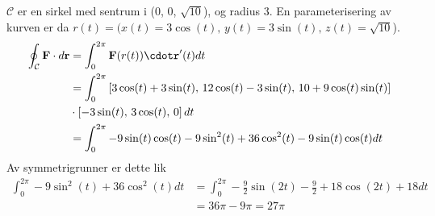 \documentclass[11pt, a4paper, norsk]{NTNUoving}
\begin{document}
\begin{oppgave}
    $\mathcal{C}$ er en sirkel med sentrum i (0, 0, $\sqrt{10}$), og radius 3. En parameterisering av kurven er da $r(t)=(x(t)=3\cos(t),\, y(t)=3\sin(t),\,z(t)=\sqrt{10}$).
    \begin{align*}
        \oint_\mathcal{C}\textbf{F}\cdot d\textbf{r} &= \int_0^{2\pi}\textbf{F}(r(t))\cdotr'(t)dt
        \\&=\int_0^{2\pi}\left[3\cos(t)+3\sin(t),\, 12\cos(t)-3\sin(t),\, 10+9\cos(t)\sin(t)\right]
        \\&\cdot \left[-3\sin(t),\, 3\cos(t),\,0\right] dt
        \\&=\int_0^{2\pi} -9\sin(t)\cos(t)-9\sin^2(t)+36\cos^2(t)-9\sin(t)\cos(t)dt
    \end{align*}
    Av symmetrigrunner er dette lik 
    \begin{align*}
        \int_0^{2\pi} -9\sin^2(t)+36\cos^2(t)dt&=\int_0^{2\pi} -\frac{9}{2}\sin(2t)-\frac{9}{2}+18\cos(2t)+18dt
        \\&=36\pi-9\pi = 27\pi
    \end{align*}
\end{oppgave}
\end{document}
